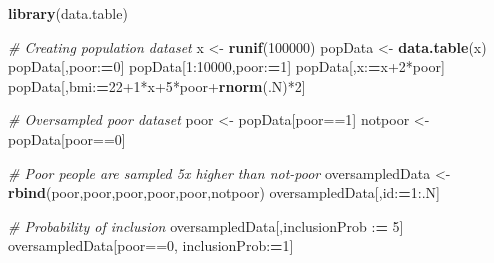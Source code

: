 \documentclass[]{book}
\newenvironment{Shaded}{\begin{snugshade}}{\end{snugshade}}
\newcommand{\KeywordTok}[1]{\textcolor[rgb]{0.13,0.29,0.53}{\textbf{{#1}}}}
\newcommand{\DecValTok}[1]{\textcolor[rgb]{0.00,0.00,0.81}{{#1}}}
\newcommand{\StringTok}[1]{\textcolor[rgb]{0.31,0.60,0.02}{{#1}}}
\newcommand{\CommentTok}[1]{\textcolor[rgb]{0.56,0.35,0.01}{\textit{{#1}}}}
\newcommand{\ErrorTok}[1]{\textcolor[rgb]{0.64,0.00,0.00}{\textbf{{#1}}}}
\newcommand{\NormalTok}[1]{{#1}}
\theoremstyle{definition}
\theoremstyle{definition}
\theoremstyle{remark}
\begin{document}
\begin{Shaded}
\begin{Highlighting}[]
\KeywordTok{library}\NormalTok{(data.table)}

\CommentTok{# Creating population dataset}
\NormalTok{x <-}\StringTok{ }\KeywordTok{runif}\NormalTok{(}\DecValTok{100000}\NormalTok{)}
\NormalTok{popData <-}\StringTok{ }\KeywordTok{data.table}\NormalTok{(x)}
\NormalTok{popData[,poor:}\ErrorTok{=}\DecValTok{0}\NormalTok{]}
\NormalTok{popData[}\DecValTok{1}\NormalTok{:}\DecValTok{10000}\NormalTok{,poor:}\ErrorTok{=}\DecValTok{1}\NormalTok{]}
\NormalTok{popData[,x:}\ErrorTok{=}\NormalTok{x}\DecValTok{+2}\NormalTok{*poor]}
\NormalTok{popData[,bmi:}\ErrorTok{=}\DecValTok{22+1}\NormalTok{*x}\DecValTok{+5}\NormalTok{*poor+}\KeywordTok{rnorm}\NormalTok{(.N)*}\DecValTok{2}\NormalTok{]}

\CommentTok{# Oversampled poor dataset}
\NormalTok{poor <-}\StringTok{ }\NormalTok{popData[poor==}\DecValTok{1}\NormalTok{]}
\NormalTok{notpoor <-}\StringTok{ }\NormalTok{popData[poor==}\DecValTok{0}\NormalTok{]}

\CommentTok{# Poor people are sampled 5x higher than not-poor}
\NormalTok{oversampledData <-}\StringTok{ }\KeywordTok{rbind}\NormalTok{(poor,poor,poor,poor,poor,notpoor)}
\NormalTok{oversampledData[,id:}\ErrorTok{=}\DecValTok{1}\NormalTok{:.N]}

\CommentTok{# Probability of inclusion}
\NormalTok{oversampledData[,inclusionProb :}\ErrorTok{=}\StringTok{ }\DecValTok{5}\NormalTok{]}
\NormalTok{oversampledData[poor==}\DecValTok{0}\NormalTok{, inclusionProb:}\ErrorTok{=}\DecValTok{1}\NormalTok{]}
\end{Highlighting}
\end{Shaded}
\end{document}
